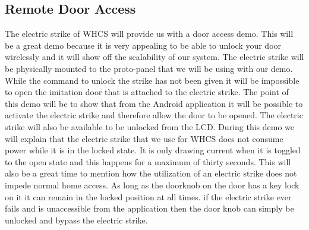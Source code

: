 \subsection{Remote Door Access}
\label{sec:demo-door}
The electric strike of WHCS will provide us with a door access demo. This will
be a great demo because it is very appealing to be able to unlock your door
wirelessly and it will show off the scalability of our system. The electric
strike will be physically mounted to the proto{}-panel that we will be using
with our demo. While the command to unlock the strike has not been given it
will be impossible to open the imitation door that is attached to the electric
strike.  The point of this demo will be to show that from the Android
application it will be possible to activate the electric strike and therefore
allow the door to be opened. The electric strike will also be available to be
unlocked from the LCD. During this demo we will explain that the electric
strike that we use for WHCS does not consume power while it is in the locked
state. It is only drawing current when it is toggled to the open state and this
happens for a maximum of thirty seconds. This will also be a great time to
mention how the utilization of an electric strike does not impede normal home
access. As long as the doorknob on the door has a key lock on it it can remain
in the locked position at all times. if the electric strike ever fails and is
unaccessible from the application then the door knob can simply be unlocked and
bypass the electric strike.
